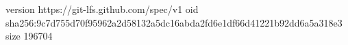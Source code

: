 version https://git-lfs.github.com/spec/v1
oid sha256:9c7d755d70f95962a2d58132a5dc16abda2fd6e1df66d41221b92dd6a5a318e3
size 196704
